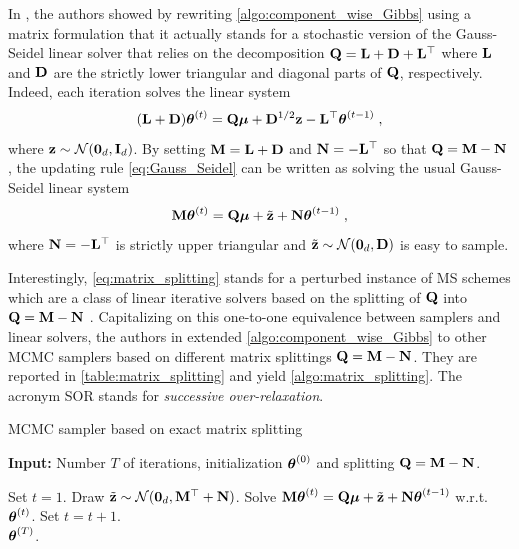 \documentclass[nohypdvips,onefignum,onetabnum]{siamart171218}
\begin{document}
In \cite{Adler1981,Barone1990,Goodman1989}, the authors showed by rewriting \cref{algo:component_wise_Gibbs} using a matrix formulation that it actually stands for a stochastic version of the Gauss-Seidel linear solver that relies on the decomposition $\mathbf{Q}=\mathbf{L}+\mathbf{D}+\mathbf{L}^{\top}$ where $\mathbf{L}$ and $\mathbf{D}$ are the strictly lower triangular and diagonal parts of $\mathbf{Q}$, respectively. Indeed, each iteration solves the linear system
\begin{equation}
 (\B{L} + \B{D})\Bs{\theta}^{(t)} = \B{Q}\Bs{\mu} + \B{D}^{1/2}\B{z} - \B{L}^{\top}\Bs{\theta}^{(t-1)}\eqsp,
  \label{eq:Gauss_Seidel}
\end{equation}
where $\mathbf{z} \sim \mathcal{N}(\mathbf{0}_d,\mathbf{I}_d)$.
By setting $\mathbf{M} = \mathbf{L}+\mathbf{D}$ and $\mathbf{N} = -\mathbf{L}^{\top}$ so that $\mathbf{Q} = \mathbf{M} - \mathbf{N}$, the updating rule \cref{eq:Gauss_Seidel} can be written as solving the usual Gauss-Seidel linear system
\begin{equation}
  \B{M}\Bs{\theta}^{(t)} = \B{Q}\Bs{\mu} +  \tilde{\B{z}}+\B{N}\Bs{\theta}^{(t-1)}\eqsp,
  \label{eq:matrix_splitting}
\end{equation}
where $\mathbf{N} = -\mathbf{L}^{\top}$ is strictly upper triangular and $\tilde{\mathbf{z}} \sim \mathcal{N}(\mathbf{0}_d,\mathbf{D})$ is easy to sample.

Interestingly, \cref{eq:matrix_splitting} stands for a perturbed instance of MS schemes which are a class of linear iterative solvers  based on the splitting of $\mathbf{Q}$ into $\mathbf{Q} = \mathbf{M} - \mathbf{N}$ \cite{Golub1989,Saad2003}.
Capitalizing on this one-to-one equivalence between samplers and linear solvers, the authors in \cite{Fox2017} extended \cref{algo:component_wise_Gibbs} to other MCMC samplers based on different matrix splittings $\mathbf{Q} = \mathbf{M} - \mathbf{N}$. They are reported in \cref{table:matrix_splitting} and yield \cref{algo:matrix_splitting}.
The acronym SOR stands for \textit{successive over-relaxation}.
%
\begin{algorithm}
\caption{MCMC sampler based on exact matrix splitting}
\label{algo:matrix_splitting}
\hspace*{\algorithmicindent} \textbf{Input:} Number $T$ of iterations, initialization $\boldsymbol{\theta}^{(0)}$ and splitting $\mathbf{Q} = \mathbf{M} - \mathbf{N}$.
\begin{algorithmic}[1]
\State Set $t=1$.
  \State Draw $\tilde{\mathbf{z}} \sim \mathcal{N}(\mathbf{0}_d,\mathbf{M}^{\top} + \mathbf{N})$.
  \State Solve $\mathbf{M}\boldsymbol{\theta}^{(t)} = \mathbf{Q}\boldsymbol{\mu} + \tilde{\mathbf{z}} + \mathbf{N}\boldsymbol{\theta}^{(t-1)} $ w.r.t. $\boldsymbol{\theta}^{(t)}$.
  \State Set $t = t + 1$.
\EndWhile\\
\Return $\boldsymbol{\theta}^{(T)}$.
\end{algorithmic}
\end{algorithm}
%
\end{document}

